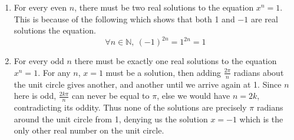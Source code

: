 \documentclass[fleqn]{article}
\newenvironment{answers}{ %
	\begin{enumerate}
		\setlength{\itemsep}{\bigskipamount}
}{\end{enumerate}}
\begin{document}
\begin{answers}
\begin{enumerate}
			\item
				For every even \(n\), there must be two real solutions to the equation \(x^n = 1\). This is because of the following which shows that both 1 and \(-1\) are real solutions the equation.
				\begin{equation*}
					\forall n \in \mathbb{N},\ (-1)^{2n} = 1^{2n} = 1
				\end{equation*}

			\item
				For every odd \(n\) there must be exactly one real solutions to the equation \(x^n = 1\). For any \(n\), \(x=1\) must be a solution, then adding \(\frac{2\pi}{n}\) radians about the unit circle gives another, and another until we arrive again at 1. Since \(n\) here is odd, \(\frac{2k\pi}{n}\) can never be equal to \(\pi\), else we would have \(n=2k\), contradicting its oddity. Thus none of the solutions are precisely \(\pi\) radians around the unit circle from 1, denying us the solution \(x=-1\) which is the only other real number on the unit circle.
		\end{enumerate}

\end{answers}
\end{document}
